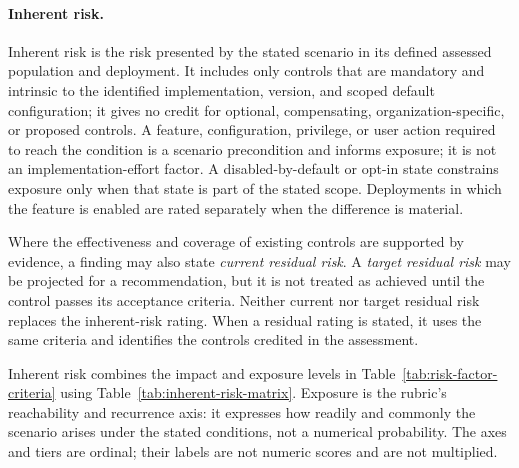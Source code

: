 \documentclass[../main.tex]{subfiles}
\begin{document}
\paragraph{Inherent risk.}
Inherent risk is the risk presented by the stated scenario in its defined
assessed population and deployment. It includes only controls that are mandatory
and intrinsic to the identified implementation, version, and scoped default
configuration; it gives no credit for optional, compensating,
organization-specific, or proposed controls. A feature, configuration,
privilege, or user action required to reach the condition is a scenario
precondition and informs exposure; it is not an implementation-effort factor. A
disabled-by-default or opt-in state constrains exposure only when that state is
part of the stated scope. Deployments in which the feature is enabled are rated
separately when the difference is material.

Where the effectiveness and coverage of existing controls are supported by
evidence, a finding may also state \emph{current residual risk}. A
\emph{target residual risk} may be projected for a recommendation, but it is not
treated as achieved until the control passes its acceptance criteria. Neither
current nor target residual risk replaces the inherent-risk rating. When a
residual rating is stated, it uses the same criteria and identifies the controls
credited in the assessment.

Inherent risk combines the impact and exposure levels in
Table~\ref{tab:risk-factor-criteria} using
Table~\ref{tab:inherent-risk-matrix}. Exposure is the rubric's reachability and
recurrence axis: it expresses how readily and commonly the scenario arises
under the stated conditions, not a numerical probability. The axes and tiers
are ordinal; their labels are not numeric scores and are not multiplied.
\end{document}
